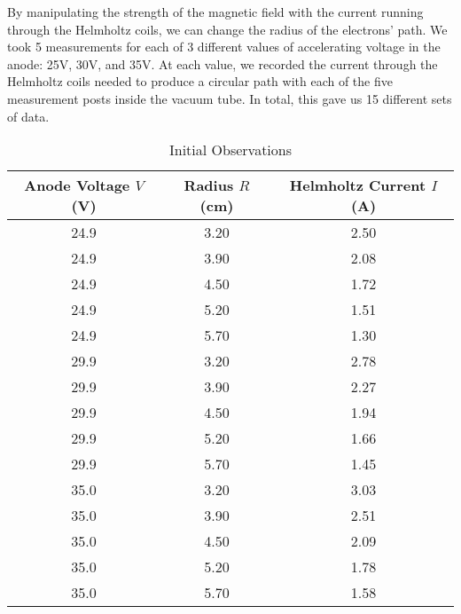 \documentclass[journal, a4paper]{IEEEtran}
\begin{document}
    By manipulating the strength of the magnetic field with the current running through the Helmholtz coils, we can change the radius of the electrons' path. We took 5 measurements for each of 3 different values of accelerating voltage in the anode: 25V, 30V, and 35V. At each value, we recorded the current through the Helmholtz coils needed to produce a circular path with each of the five measurement posts inside the vacuum tube. In total, this gave us 15 different sets of data. 

	\begin{table}[!hbt]
		\begin{center}
		\caption{Initial Observations}
		\label{tab:InitialData}
		\begin{tabular}{|c|c|c|}
			\hline
			Anode Voltage $V$ (V) & Radius $R$ (cm) & Helmholtz Current $I$ (A) \\
			\hline
			24.9 & 3.20 & 2.50 \\
			\hline
			24.9 & 3.90 & 2.08 \\
			\hline
			24.9 & 4.50 & 1.72 \\
			\hline
            24.9 & 5.20 & 1.51 \\
            \hline 
            24.9 & 5.70 & 1.30 \\
            \hline
            29.9 & 3.20 & 2.78 \\
            \hline
            29.9 & 3.90 & 2.27 \\
            \hline
            29.9 & 4.50 & 1.94 \\
            \hline
            29.9 & 5.20 & 1.66 \\
            \hline
            29.9 & 5.70 & 1.45 \\
            \hline
            35.0 & 3.20 & 3.03 \\
            \hline
            35.0 & 3.90 & 2.51 \\
            \hline
            35.0 & 4.50 & 2.09 \\
            \hline
            35.0 & 5.20 & 1.78 \\
           	\hline
            35.0 & 5.70 & 1.58 \\
            \hline
		\end{tabular}
		\end{center}
	\end{table}
    
\end{document}
